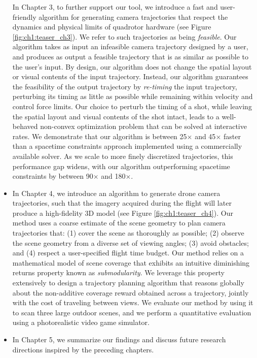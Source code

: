 \begin{itemize}
In Chapter 3, to further support our tool, we introduce a fast and user-friendly algorithm for generating camera trajectories that respect the dynamics and physical limits of quadrotor hardware (see Figure \ref{fig:ch1:teaser_ch3}).
We refer to such trajectories as being \emph{feasible}.
Our algorithm takes as input an infeasible camera trajectory designed by a user, and produces as output a feasible trajectory that is as similar as possible to the user's input.
By design, our algorithm does not change the spatial layout or  visual contents of the input trajectory.
Instead, our algorithm guarantees the feasibility of the output trajectory by \emph{re-timing} the input trajectory, perturbing its timing as little as possible while remaining within velocity and control force limits.
Our choice to perturb the timing of a shot, while leaving the spatial layout and visual contents of the shot intact, leads to a well-behaved non-convex optimization problem that can be solved at interactive rates.
We demonstrate that our algorithm is between 25$\times$ and 45$\times$ faster than a spacetime constraints approach implemented using a commercially available solver.
As we scale to more finely discretized trajectories, this performance gap widens, with our algorithm outperforming spacetime constraints by between 90$\times$ and 180$\times$.

\item

In Chapter 4, we introduce an algorithm to generate drone camera trajectories, such that the imagery acquired during the flight will later produce a high-fidelity 3D model (see Figure \ref{fig:ch1:teaser_ch4}). Our method uses a coarse estimate of the scene geometry to plan camera trajectories that: (1) cover the scene as thoroughly as possible; (2) observe the scene geometry from a diverse set of viewing angles; (3) avoid obstacles; and (4) respect a user-specified flight time
budget. Our method relies on a mathematical model of scene coverage that exhibits an intuitive diminishing returns property known as \emph{submodularity}.
We leverage this property extensively to design a trajectory planning algorithm  that reasons globally about the non-additive coverage reward obtained across a trajectory, jointly with the cost of traveling between views.
We evaluate our method by using it to scan three large outdoor scenes, and we perform a quantitative evaluation using a photorealistic video game simulator.

\item

In Chapter 5, we summarize our findings and discuss future research directions inspired by the preceding chapters.

\end{itemize}

